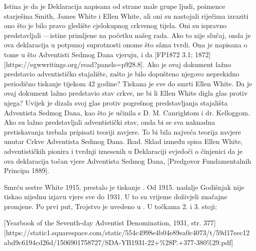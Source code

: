 Istina je da je Deklaracija  napisana od strane male grupe ljudi, poimence starješina Smith, James White i Ellen White, ali oni su nastojali riječima izraziti ono što je bilo pravo gledište cjelokupnog crkvenog tijela. Oni su ispravno predstavljali —istine primljene na početku našeg rada. Ako to nije slučaj, onda je ova deklaracija u potpunoj suprotnosti onome što sâma tvrdi. Ona je napisana  o tome u što Adventisti Sedmog Dana vjeruju,  i da [FP1872 3.1; 1872][https://egwwritings.org/read?panels=p928.8]. Ako je ovaj dokument lažno predstavio adventističko stajalište, zašto je bilo dopušteno njegovo neprekidno periodično tiskanje tijekom 42 godine? Tiskana je sve do smrti Ellen White. Da je ovaj dokument lažno predstavio stav crkve, ne bi li Ellen White digla glas protiv njega? Uvijek je dizala svoj glas protiv pogrešnog predstavljanja stajališta Adventista Sedmog Dana, kao što je učinila s D. M. Canrightom i dr. Kelloggom. Ako su  lažno predstavljali adventistički stav, onda bi se sva naknadna pretiskavanja trebala pripisati teoriji zavjere. To bi bila najveća teorija zavjere unutar Crkve Adventista Sedmog Dana. Ikad. Sklad između spisa Ellen White, adventističkih pionira i tvrdnji iznesenih u Deklaraciji  svjedoči o činjenici da je ova deklaracija točan  vjere Adventista Sedmog Dana, [Predgovor Fundamentalnih Principa 1889].

Smrću sestre White 1915. prestalo je tiskanje . Od 1915. nadalje Godišnjak nije tiskao nijednu izjavu vjere sve do 1931. U to su vrijeme  doživjeli značajne promjene. Po prvi put, Trojstvo je uvedeno u . U točkama 2. i 3. stoji:


[Yearbook of the Seventh-day Adventist Denomination, 1931, str. 377][https://static1.squarespace.com/static/554c4998e4b04e89ea0c4073/t/59d17eec12abd9c6194cd26d/1506901758727/SDA-YB1931-22+\%28P.+377-380\%29.pdf]

